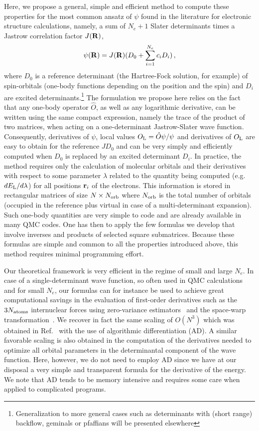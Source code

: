 \documentclass[aip,jcp,reprint,floatfix,onecolumn]{revtex4-1}
\begin{document}
Here, we propose  a general, simple and efficient method to compute these properties for the most common ansatz of $\psi$ found in the literature for electronic structure calculations,
namely, a sum of $N_e+1$ Slater determinants times a Jastrow correlation factor $J ({\bf R})$,
\begin{equation}
\psi ({\bf R}) = J ({\bf R}) (D_0 + \sum_{i=1}^{N_e} c_i D_i) \,,
\label{cijas}
\end{equation}
where $D_0$ is a reference determinant (the Hartree-Fock solution, for example) of spin-orbitals (one-body functions depending on the position and
the spin) and $D_i$ are excited determinants.\footnote{Generalization to more general cases such as determinants with (short range) backflow, geminals or pfaffians will be presented elsewhere}
The formulation we propose here relies on the fact that any one-body operator ${\hat O}$, as well as any
logarithmic derivative, can be written
using the same compact expression, namely the trace of the product of two matrices, when acting on a one-determinant Jastrow-Slater wave function.
Consequently, derivatives of $\psi$, local values $O_{\rm L}={\hat O}\psi/\psi$
and derivatives of $O_{\rm L}$ are easy
to obtain for the reference $JD_0$ and can be very
simply and efficiently computed when $D_0$ is replaced by an excited determinant $D_i$.
In practice, the method requires only the calculation of molecular orbitals and their derivatives with respect to some parameter $\lambda$ related to
the quantity being computed (e.g.\ $dE_{\rm L}/d\lambda$) for
all positions ${\bf r}_i$ of the electrons.  This
information is stored in rectangular matrices of size $N \times N_{\rm orb}$ where $N_{\rm orb}$ is the total number of orbitals (occupied in the
reference plus virtual in case of a multi-determinant expansion).
Such one-body quantities are very simple to code and are already available in many QMC codes.  One has then to apply the few formulas we develop
that involve  inverses and products of selected square submatrices.  Because these formulas are simple and common to all the properties introduced above, this
method requires minimal programming effort.

Our theoretical framework is very efficient in the regime of small and large $N_e$. In case of a single-determinant wave function, so often used  in QMC calculations and for small $N_e$, our
formulas can for instance be used to achieve great computational savings in the evaluation of
first-order derivatives such as the $3N_{\rm atoms}$ internuclear forces using zero-variance estimators~\cite{assaraf03} and the space-warp
transformation~\cite{Umrigar89,Filippi00}.
We recover in fact the same scaling of $O(N^3)$ which was obtained in Ref.~ with the use of algorithmic
differentiation (AD).
A similar favorable scaling is also obtained in the computation of the derivatives needed to optimize all orbital
parameters in the determinantal component of the wave function.
Here, however, we do not need to employ AD since we have at our disposal a very simple and transparent formula for the derivative of the energy.
We note that AD tends to be memory
intensive and requires some care when applied to complicated programs.
\end{document}
